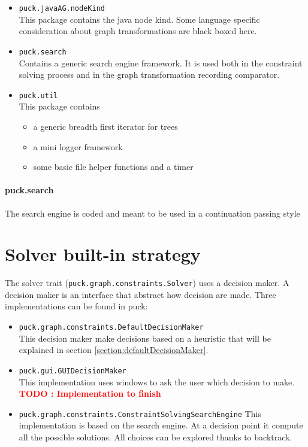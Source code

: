 \documentclass[]{article}
\newcommand{\todo}[1]{\textcolor{red}{\textbf{TODO : #1}}}
\begin{document}
\begin{itemize}
\item \verb|puck.javaAG.nodeKind|\\
	This package contains the java node kind. Some language specific consideration about graph transformations are black boxed here.

\item \verb|puck.search|\\
	Contains a generic search engine framework. It is used both in the constraint solving process and in the graph transformation recording comparator.

\item \verb|puck.util|\\
This package contains 
\begin{itemize}
\item a generic breadth first iterator for trees
\item a mini logger framework
\item some basic file helper functions and a timer
\end{itemize}
\end{itemize}


\paragraph{puck.search} The search engine is coded and meant to be used in a continuation passing style

\section{Solver built-in strategy}
The solver trait (\verb|puck.graph.constraints.Solver|) uses a decision maker. A decision maker is an interface that abstract how decision are made. Three implementations can be found in puck:
\begin{itemize}
	\item \verb|puck.graph.constraints.DefaultDecisionMaker|\\
	This decision maker make decisions based on a heuristic that will be explained in section \ref{section:defaultDecisionMaker}.
	\item \verb|puck.gui.GUIDecisionMaker|\\
	This implementation uses windows to ask the user which decision to make. \todo{Implementation to finish}
	\item \verb|puck.graph.constraints.ConstraintSolvingSearchEngine|
	This implementation is based on the search engine. At a decision point it compute all the possible solutions. All choices can be explored thanks to backtrack.
\end{itemize}
\end{document}
